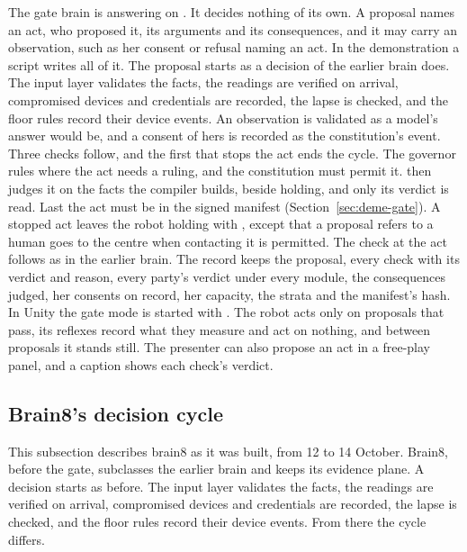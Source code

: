 The gate brain is  answering on . It decides nothing of its own.
A proposal names an act, who proposed it, its arguments and its consequences, and it may carry an
observation, such as her consent or refusal naming an act. In the demonstration a script writes all
of it. The proposal starts as a decision of the earlier brain does. The input layer validates the
facts, the readings are verified on arrival, compromised devices and credentials are recorded, the
lapse is checked, and the floor rules record their device events. An observation is validated as a
model's answer would be, and a consent of hers is recorded as the constitution's event.
Three checks follow, and the first that stops the act ends the cycle. The governor rules where the
act needs a ruling, and the constitution must permit it. \deme{} then judges it on the facts the
compiler builds, beside holding, and only its verdict is read. Last the act must be in the signed
manifest (Section~\ref{sec:deme-gate}). A stopped act leaves the robot holding with
, except that a proposal \deme{} refers to a human goes to the centre
when contacting it is permitted. The check at the act follows as in the earlier brain.
The record keeps the proposal, every check with its verdict and reason, every party's verdict under
every module, the consequences \deme{} judged, her consents on record, her capacity, the strata and
the manifest's hash.
In Unity the gate mode is started with . The robot acts only on proposals that pass, its
reflexes record what they measure and act on nothing, and between proposals it stands still. The
presenter can also propose an act in a free-play panel, and a caption shows each check's verdict.

\subsection{Brain8's decision cycle}\label{sec:home-brain8}

This subsection describes brain8 as it was built, from 12 to 14 October. Brain8, 
before the gate, subclasses the earlier brain and keeps its evidence
plane. A decision starts as before. The input layer validates the facts, the readings are verified
on arrival, compromised devices and credentials are recorded, the lapse is checked, and the floor
rules record their device events. From there the cycle differs.

